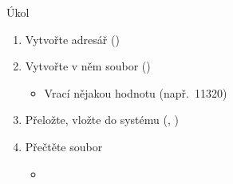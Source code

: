 \begin{frame}{Úkol}

  \begin{enumerate}
  \item Vytvořte adresář ()

  \item Vytvořte v něm soubor ()
  \begin{itemize}
    \item Vrací nějakou hodnotu (např.\ 11320)
  \end{itemize}

  \item Přeložte, vložte do systému (, )

  \item Přečtěte soubor
  \begin{itemize}
    \item {}
  \end{itemize}

  \end{enumerate}

\end{frame}


